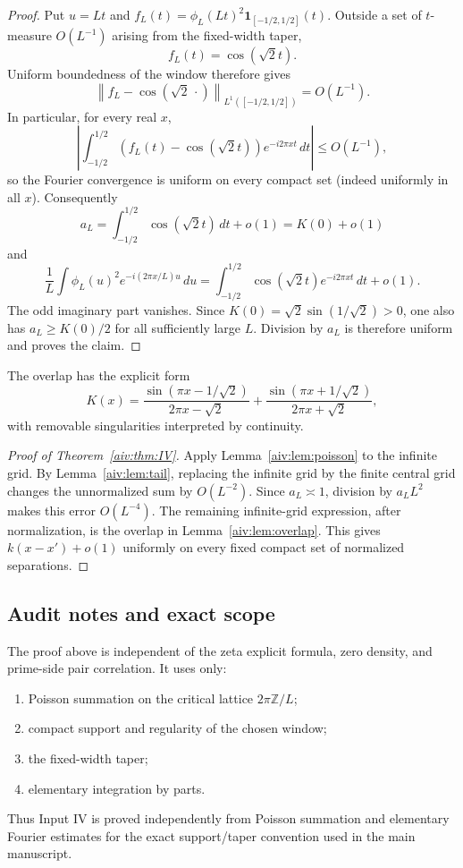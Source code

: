 \documentclass[11pt]{article}
\begin{document}
\begin{proof}
Put $u=Lt$ and
$f_L(t)=\phi_L(Lt)^2\mathbf 1_{[-1/2,1/2]}(t)$.  Outside a set of
$t$-measure $O(L^{-1})$ arising from the fixed-width taper,
\[
 f_L(t)=\cos(\sqrt2 t).
\]
Uniform boundedness of the window therefore gives
\[
 \left\|f_L-\cos(\sqrt2\,\cdot)\right\|_{L^1([-1/2,1/2])}
 =O(L^{-1}).
\]
In particular, for every real $x$,
\[
 \left|
 \int_{-1/2}^{1/2}
 (f_L(t)-\cos(\sqrt2 t))e^{-i2\pi xt}\,dt
 \right|
 \le O(L^{-1}),
\]
so the Fourier convergence is uniform on every compact set (indeed uniformly
in all $x$).  Consequently
\[
 a_L
 =
 \int_{-1/2}^{1/2}\cos(\sqrt2 t)\,dt+o(1)
 =
 K(0)+o(1)
\]
and
\[
 \frac1L\int\phi_L(u)^2e^{-i(2\pi x/L)u}\,du
 =
 \int_{-1/2}^{1/2}
 \cos(\sqrt2 t)e^{-i2\pi xt}\,dt+o(1).
\]
The odd imaginary part vanishes.  Since
$K(0)=\sqrt2\sin(1/\sqrt2)>0$, one also has $a_L\ge K(0)/2$ for all
sufficiently large $L$.  Division by $a_L$ is therefore uniform and proves
the claim.
\end{proof}

The overlap has the explicit form
\[
 K(x)=
 \frac{\sin(\pi x-1/\sqrt2)}{2\pi x-\sqrt2}
 +
 \frac{\sin(\pi x+1/\sqrt2)}{2\pi x+\sqrt2},
\]
with removable singularities interpreted by continuity.

\begin{proof}[Proof of Theorem~\ref{aiv:thm:IV}]
Apply Lemma~\ref{aiv:lem:poisson} to the infinite grid.  By
Lemma~\ref{aiv:lem:tail}, replacing the infinite grid by the finite central grid
changes the unnormalized sum by $O(L^{-2})$.  Since
$a_L\asymp1$, division by $a_LL^2$ makes this error $O(L^{-4})$.
The remaining infinite-grid expression, after normalization, is the overlap
in Lemma~\ref{aiv:lem:overlap}.  This gives $k(x-x')+o(1)$ uniformly on every
fixed compact set of normalized separations.
\end{proof}

\subsection{Audit notes and exact scope}

The proof above is independent of the zeta explicit formula, zero density,
and prime-side pair correlation.  It uses only:
\begin{enumerate}
\item Poisson summation on the critical lattice $2\pi\mathbb Z/L$;
\item compact support and regularity of the chosen window;
\item the fixed-width taper;
\item elementary integration by parts.
\end{enumerate}
Thus Input IV is proved independently from Poisson summation and elementary Fourier estimates for the exact support/taper convention used in the main manuscript.
\end{document}
